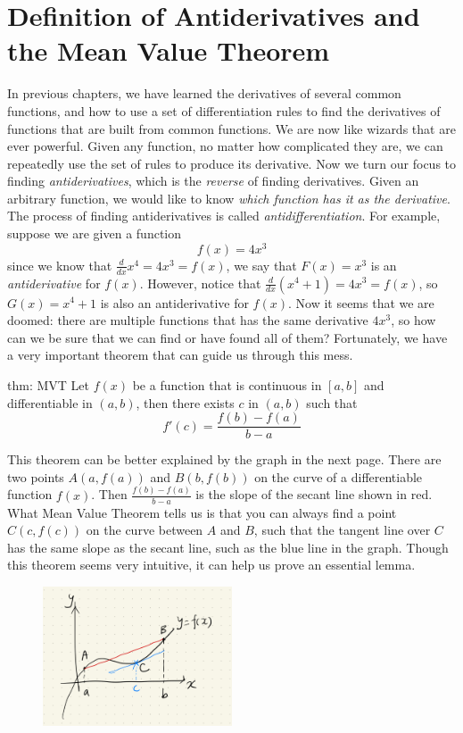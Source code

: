 \section{Definition of Antiderivatives and the Mean Value Theorem}
In previous chapters, we have learned the derivatives of several common functions, and how to use a set of differentiation rules to find the derivatives of functions that are built from common functions.  We are now like wizards that are ever powerful.  Given any function, no matter how complicated they are, we can repeatedly use the set of rules to produce its derivative.  Now we turn our focus to finding \textit{antiderivatives}, which is the \textit{reverse} of finding derivatives.  Given an arbitrary function, we would like to know \textit{which function has it as the derivative}.  The process of finding antiderivatives is called \textit{antidifferentiation}.  For example, suppose we are given a function
\[f(x) = 4x^3\]
since we know that $\frac{d}{dx}x^4 = 4x^3 = f(x)$, we say that $F(x) = x^3$ is an \textit{antiderivative} for $f(x)$.  However, notice that $\frac{d}{dx}(x^4+1) = 4x^3 = f(x)$, so $G(x) = x^4+1$ is also an antiderivative for $f(x)$.  Now it seems that we are doomed: there are multiple functions that has the same derivative $4x^3$, so how can we be sure that we can find or have found all of them?  Fortunately, we have a very important theorem that can guide us through this mess.

\begin{theo}{thm: MVT}
    Let $f(x)$ be a function that is continuous in $[a, b]$ and differentiable in $(a, b)$, then there exists $c$ in $(a, b)$ such that
    \[f'(c) = \frac{f(b)-f(a)}{b-a}\]
\end{theo}
This theorem can be better explained by the graph in the next page.  There are two points $A(a, f(a))$ and $B(b, f(b))$ on the curve of a differentiable function $f(x)$.  Then $\frac{f(b)-f(a)}{b-a}$ is the slope of the secant line shown in red.  What Mean Value Theorem tells us is that you can always find a point $C(c, f(c))$ on the curve between $A$ and $B$, such that the tangent line over $C$ has the same slope as the secant line, such as the blue line in the graph.  Though this theorem seems very intuitive, it can help us prove an essential lemma.

\begin{figure}[ht]
    \centering
    \includegraphics[width = 0.5\textwidth]{figures/chap 06/MVT.png}
\end{figure}

